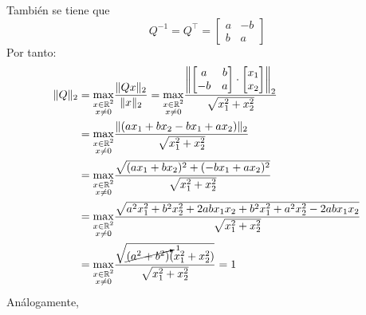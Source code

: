 \begin{enumerate}[label=\color{red}\textbf{\arabic*)}, leftmargin=*]
\begin{enumerate}[label=\color{red}\alph*)]
		También se tiene que \[ Q^{-1}=Q^\intercal=\begin{bmatrix}
				a & -b \\
				b & a
			\end{bmatrix} \]Por tanto:
		\[ \begin{aligned}
				\|Q\|_2 & =\underset{\begin{subarray}{c}
						 x\in\operatorname{\mathbb{R}}^2\\
						 x\neq0
					 \end{subarray}}{\max}\dfrac{\|Qx\|_2}{\|x\|_2}=\underset{\begin{subarray}{c}
x\in\operatorname{\mathbb{R}}^2\\
x\neq0
\end{subarray}}{\max}\dfrac{\left\|\begin{bmatrix}
a& b \\
-b & a
\end{bmatrix}\cdot\begin{bmatrix}
						 x_1 \\
						 x_2
					 \end{bmatrix}\right\|_2}{\sqrt{x_1^2+x_2^2}} \\
				& =\underset{\begin{subarray}{c}
						 x\in\operatorname{\mathbb{R}}^2\\
						 x\neq0
					 \end{subarray}}{\max}\dfrac{\|(ax_1+bx_2-bx_1+ax_2)\|_2}{\sqrt{x_1^2+x_2^2}} \\
				& =\underset{\begin{subarray}{c}
						 x\in\operatorname{\mathbb{R}}^2\\
						 x\neq0
					 \end{subarray}}{\max}\dfrac{\sqrt{(ax_1+bx_2)^2+(-bx_1+ax_2)^2}}{\sqrt{x_1^2+x_2^2}} \\
				&=\underset{\begin{subarray}{c}
										 x\in\operatorname{\mathbb{R}}^2\\
										 x\neq0
									 \end{subarray}}{\max}\dfrac{\sqrt{a^2x_1^2+b^2x_2^2+2abx_1x_2+b^2x_1^2+a^2x_2^2-2abx_1x_2}}{\sqrt{x_1^2+x_2^2}}\\
				&=\underset{\begin{subarray}{c}
										 x\in\operatorname{\mathbb{R}}^2\\
										 x\neq0
									 \end{subarray}}{\max}\dfrac{\sqrt{\cancelto{1}{(a^2+b^2)}(x_1^2+x_2^2)}}{\sqrt{x_1^2+x_2^2}}=1
			\end{aligned} \]Análogamente, 
			\[ \begin{aligned}

\end{aligned}\]
\end{enumerate}
\end{enumerate}

